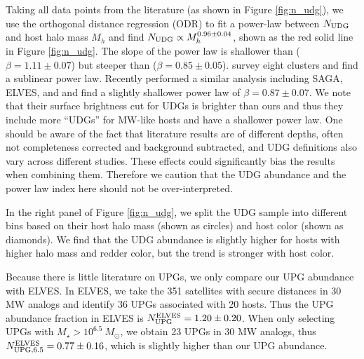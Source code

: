 \documentclass[twocolumn,astrosymb,twocolappendix,linenumbers]{aastex631}
\begin{document}
\begin{CJK*}{UTF8}{gbsn}
Taking all data points from the literature (as shown in Figure \ref{fig:n_udg}), we use the orthogonal distance regression (ODR) to fit a power-law between $N_{\rm UDG}$ and host halo mass $M_h$ and find $N_{\rm UDG} \propto M_h^{0.96\pm 0.04}$, shown as the red solid line in Figure \ref{fig:n_udg}. The slope of the power law is shallower than \citet{vdBurg2017} ($\beta=1.11\pm0.07$) but steeper than \citet{Roman2017b} ($\beta=0.85\pm0.05$). \citet{ManceraPina2018} survey eight clusters and find a sublinear power law. Recently \citet{Karunakaran2022b} performed a similar analysis including SAGA, ELVES, and \citet{Nashimoto2022} and find a slightly shallower power law of $\beta=0.87\pm0.07$. We note that their surface brightness cut for UDGs is brighter than ours and thus they include more ``UDGs'' for MW-like hosts and have a shallower power law. One should be aware of the fact that literature results are of different depths, often not completeness corrected and background subtracted, and UDG definitions also vary across different studies. These effects could significantly bias the results when combining them. Therefore we caution that the UDG abundance and the power law index here should not be over-interpreted. 


In the right panel of Figure \ref{fig:n_udg}, we split the UDG sample into different bins based on their host halo mass (shown as circles) and host color (shown as diamonds). We find that the UDG abundance is slightly higher for hosts with higher halo mass and redder color, but the trend is stronger with host color. 

Because there is little literature on UPGs, we only compare our UPG abundance with ELVES. In ELVES, we take the 351 satellites with secure distances in 30 MW analogs and identify 36 UPGs associated with 20 hosts. Thus the UPG abundance fraction in ELVES is $N_{\rm UPG}^{\rm ELVES} = 1.20 \pm 0.20$. When only selecting UPGs with $M_\star > 10^{6.5}\ M_\odot$, we obtain 23 UPGs in 30 MW analogs, thus $N_{\rm UPG, 6.5}^{\rm ELVES} = 0.77 \pm 0.16$, which is slightly higher than our UPG abundance.


\vspace{1em}


\end{CJK*}
\end{document}
